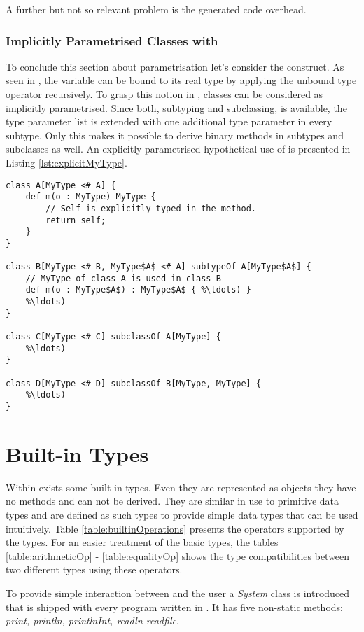 A further but not so relevant problem is the generated code overhead.

\subsubsection{Implicitly Parametrised Classes with \mytype}
\label{sec:implicitlyMyType}
To conclude this section about parametrisation let's consider the
\mytype construct. As seen in , the
\self variable can be bound to its real type by applying the unbound
type operator recursively. To grasp this notion in \ooplss, classes
can be considered as implicitly parametrised. Since both, subtyping
and subclassing, is available, the type parameter list is extended
with one additional type parameter in every subtype. Only this makes it
possible to derive binary methods in subtypes and subclasses as well. An
explicitly parametrised hypothetical use of \mytype is presented in
Listing \ref{lst:explicitMyType}.

\begin{lstlisting}[language=ooplss,caption=Explicit \mytype parametrisation,label=lst:explicitMyType]
class A[MyType <# A] {
	def m(o : MyType) MyType {
		// Self is explicitly typed in the method.
		return self;
	}
}

class B[MyType <# B, MyType$A$ <# A] subtypeOf A[MyType$A$] {
	// MyType of class A is used in class B
	def m(o : MyType$A$) : MyType$A$ { %\ldots) }
	%\ldots)
}

class C[MyType <# C] subclassOf A[MyType] {
	%\ldots)
}

class D[MyType <# D] subclassOf B[MyType, MyType] {
	%\ldots)
}
\end{lstlisting}

\section{Built-in Types}
\label{sec:builtinTypes}
Within \ooplss exists some built-in types. Even they are represented
as objects they have no methods and can not be derived. They are
similar in use to primitive data types and are defined as such types
to provide simple data types that can be used intuitively. Table
\ref{table:builtinOperations} presents the operators supported by
the types. For an easier treatment of the basic types, the tables
\ref{table:arithmeticOp} - \ref{table:equalityOp} shows the type
compatibilities between two different types using these operators.

To provide simple interaction between \ooplss and the user a \emph{System}
class is introduced that is shipped with every program written in
\ooplss. It has five non-static methods: \textit{print, println,
printlnInt, readln readfile}.

